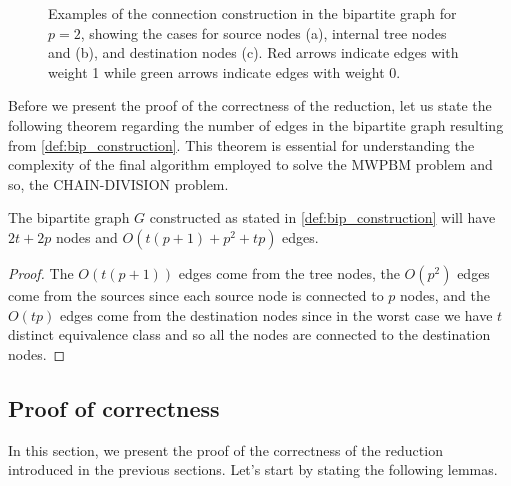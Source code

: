 \begin{figure}[H]
\begin{subfigure}[b]{0.3\textwidth}
        \caption{}
        \label{fig:sub3}
    \end{subfigure}

    \caption[Examples of reduction to a bipartite graph]{Examples of the connection construction in the bipartite graph for $p=2$, showing the cases for source nodes \sourceset (a), internal tree nodes  and  (b), and destination nodes \destset (c). Red arrows indicate edges with weight 1 while green arrows indicate edges with weight 0.}
    \label{fig:reduction_small_examples}
\end{figure}

Before we present the proof of the correctness of the reduction, let us state the following theorem regarding the number of edges in the bipartite graph resulting from \cref{def:bip_construction}. This theorem is essential for understanding the complexity of the final algorithm employed to solve the \textsc{MWPBM} problem and so, the \textsc{CHAIN-DIVISION} problem.

\begin{theorem}
    The bipartite graph $G$ constructed as stated in \cref{def:bip_construction} will have $2t + 2p$ nodes and $O(t (p + 1) + p^2 + tp)$ edges.
\end{theorem}

\begin{proof}
    The $O(t (p + 1))$ edges come from the tree nodes, the $O(p^2)$ edges come from the sources since each source node is connected to $p$ nodes, and the $O(tp)$ edges come from the destination nodes since in the worst case we have $t$ distinct equivalence class and so all the nodes are connected to the destination nodes. 
\end{proof}

\subsection{Proof of correctness}
In this section, we present the proof of the correctness of the reduction introduced in the previous sections. Let's start by stating the following lemmas.

